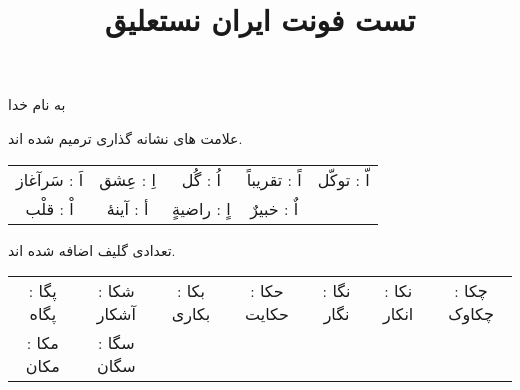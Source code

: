 \documentclass[14pt,a4paper]{article}
\begin{document}
\title{تست فونت ایران نستعلیق}
\author{ }\date{ }

\maketitle

\begin{center}
به نام خدا
\end{center}

علامت های نشانه گذاری ترمیم شده اند.

\vspace{3mm}
\begin{tabular}{c c c c c}
 اَ : سَرآغاز & اِ : عِشق & اُ : گُل & اً : تقریباً & اّ : توکّل \\
  اْ : قلْب & أ : آینهٔ & اٍ : راضیةٍ & اٌ : خبیرٌ & 
\end{tabular}
\vspace{3mm}

تعدادی گلیف اضافه شده اند.

\vspace{3mm}
\begin{tabular}{c c c c c c c}
پگا : پگاه & شکا : آشکار & بکا : بکاری & حکا : حکایت & نگا : نگار & نکا : انکار & چکا : چکاوک \\
مکا : مکان & سگا : سگان & 
\end{tabular}
\vspace{3mm}
\end{document}
